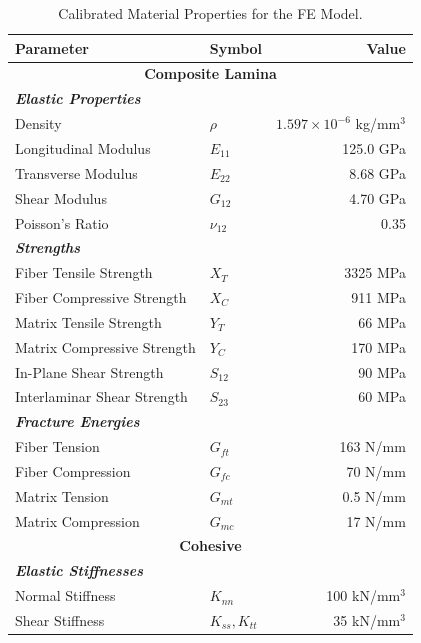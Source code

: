 \documentclass[
  preprint,
  12pt,
  a4paper
]{elsarticle}
\newcommand{\new}[1]{#1}
\begin{document}
\begin{table}[htbp]
    \centering
    \caption{Calibrated Material Properties for the FE Model.}
    \label{tab:material_properties}
    \renewcommand{\arraystretch}{1.2}
    \begin{tabular}{l l r}
        \toprule
        \textbf{Parameter} & \textbf{Symbol} & \textbf{Value} \\
        \midrule
        \multicolumn{3}{c}{\textbf{Composite Lamina}} \\
        \textit{\textbf{Elastic Properties}} & & \\
        Density & $\rho$ & $1.597 \times 10^{-6}$ kg/mm$^3$ \\
        Longitudinal Modulus & $E_{11}$ & 125.0 GPa \\
        Transverse Modulus & $E_{22}$ & 8.68 GPa \\
        Shear Modulus & $G_{12}$ & 4.70 GPa \\
        Poisson's Ratio & $\nu_{12}$ & 0.35 \\
        
        \textit{\textbf{Strengths}} & & \\
        Fiber Tensile Strength & $X_T$ & 3325 MPa \\
        Fiber Compressive Strength & $X_C$ & 911 MPa \\
        Matrix Tensile Strength & $Y_T$ & 66 MPa \\
        Matrix Compressive Strength & $Y_C$ & 170 MPa \\
        In-Plane Shear Strength & $S_{12}$ & 90 MPa \\
        Interlaminar Shear Strength & $S_{23}$ & 60 MPa \\
        
        \textit{\textbf{Fracture Energies}} & & \\
        Fiber Tension & $G_{ft}$ & 163 N/mm \\
        Fiber Compression & $G_{fc}$ & 70 N/mm \\
        Matrix Tension & $G_{mt}$ & 0.5 N/mm \\
        Matrix Compression & $G_{mc}$ & 17 N/mm \\
        
        \midrule
        \multicolumn{3}{c}{\textbf{Cohesive}} \\
        \textit{\textbf{Elastic Stiffnesses}} & & \\
        Normal Stiffness & $K_{nn}$ & \new{100 kN/mm$^3$} \\
        Shear Stiffness & $K_{ss}, K_{tt}$ & \new{35 kN/mm$^3$} \\
        

\end{tabular}
\end{table}
\end{document}
